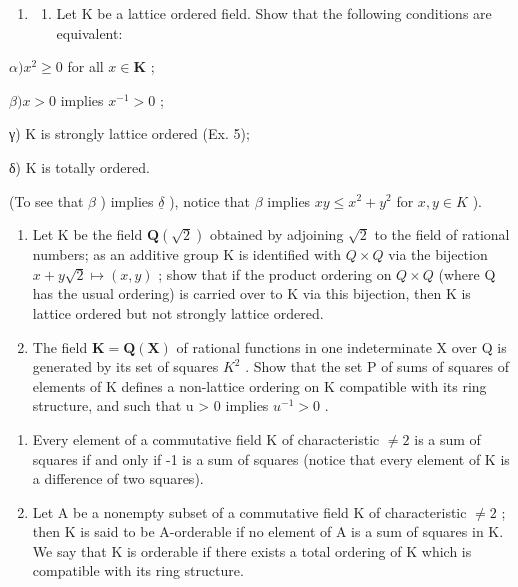 \begin{enumerate}
\def\labelenumi{\arabic{enumi})}
\setcounter{enumi}{5}
\tightlist
\item
  \begin{enumerate}
  \def\labelenumii{\alph{enumii})}
  \tightlist
  \item
    Let K be a lattice ordered field. Show that the following conditions are equivalent:
  \end{enumerate}
\end{enumerate}

\(\alpha) x^{2} \geqslant 0\) for all \(x \in \mathbf{K}\) ;

\(\beta) x > 0\) implies \(x^{-1} > 0\) ;

γ) K is strongly lattice ordered (Ex. 5);

δ) K is totally ordered.

(To see that \(\beta\) ) implies \(\underline{\delta}\) ), notice that \(\beta\) implies \(xy \leqslant x^2 + y^2\) for \(x, y \in K\) ).

\begin{enumerate}
\def\labelenumi{\alph{enumi})}
\setcounter{enumi}{1}
\item
  Let K be the field \(\mathbf{Q}(\sqrt{2})\) obtained by adjoining \(\sqrt{2}\) to the field of rational numbers; as an additive group K is identified with \(Q \times Q\) via the bijection \(x + y \sqrt{2} \mapsto (x, y)\) ; show that if the product ordering on \(Q \times Q\) (where Q has the usual ordering) is carried over to K via this bijection, then K is lattice ordered but not strongly lattice ordered.
\item
  The field \(\mathbf{K} = \mathbf{Q}(\mathbf{X})\) of rational functions in one indeterminate X over Q is generated by its set of squares \(K^{2}\) . Show that the set P of sums of squares of elements of K defines a non-lattice ordering on K compatible with its ring structure, and such that u \textgreater{} 0 implies \(u^{-1} > 0\) .
\end{enumerate}

\begin{enumerate}
\def\labelenumi{\arabic{enumi})}
\setcounter{enumi}{6}
\item
  Every element of a commutative field K of characteristic \(\neq 2\) is a sum of squares if and only if -1 is a sum of squares (notice that every element of K is a difference of two squares).
\item
  Let A be a nonempty subset of a commutative field K of characteristic \(\neq 2\) ; then K is said to be A-orderable if no element of A is a sum of squares in K. We say that K is orderable if there exists a total ordering of K which is compatible with its ring structure.
\end{enumerate}

